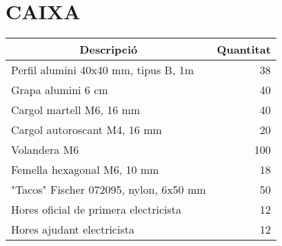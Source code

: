 \chapter{\uppercase{Caixa}}

\begin{table}[H]
  \begin{center}
    \begin{tabularx} {\textwidth} {|X|r|} \hline
  \multicolumn{1}{|c|}{Descripció} &  \multicolumn{1}{c|}{Quantitat}\\ \hline \hline
    Perfil alumini 40x40 mm, tipus B, 1m & 38 \\ \hline 
    Grapa alumini 6 cm & 40 \\ \hline 
    Cargol martell M6, 16 mm & 40 \\ \hline 
    Cargol autoroscant M4, 16 mm & 20 \\ \hline 
    Volandera M6 & 100 \\ \hline 
    Femella hexagonal M6, 10 mm & 18 \\ \hline 
    "Tacos" Fischer 072095, nylon, 6x50 mm & 50 \\ \hline 
    Hores oficial de primera electricista & 12 \\ \hline 
    Hores ajudant electricista & 12 \\ \hline 
    \end{tabularx}%
  \end{center}

  \label{tab:addlabel}%
\end{table}%